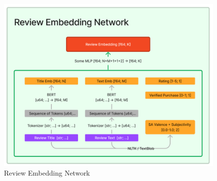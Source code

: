 \documentclass[utf8x]{ctexart}
\begin{document}
\begin{figure}[htb]
  \centering
  \includegraphics[width=\linewidth]{./ren.png}
  \caption{Review Embedding Network}
  \label{fig:ren}
\end{figure}
\end{document}
